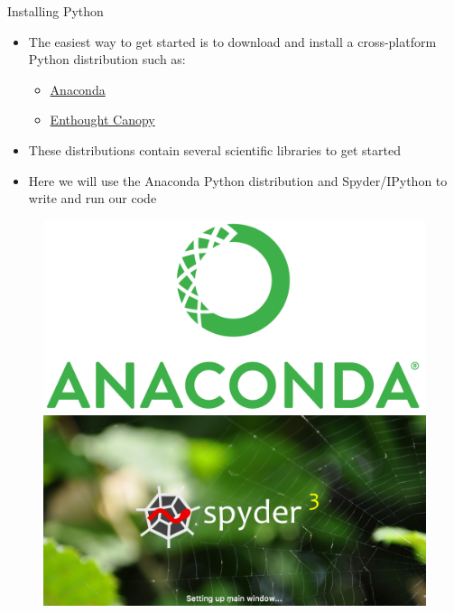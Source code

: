 \documentclass[pdf]{beamer}
\begin{document}
\begin{frame}{Installing Python}
\begin{itemize}\addtolength{\itemsep}{0.5\baselineskip}
	\item The easiest way to get started is to download and install a cross-platform Python distribution such as:
	\begin{itemize}
		\item \href{https://www.continuum.io/downloads}{Anaconda}
		\item \href{https://store.enthought.com/downloads/}{Enthought Canopy}
	\end{itemize}
	\item These distributions contain several scientific libraries to get started
	\item Here we will use the Anaconda Python distribution and Spyder/IPython to write and run our code  
\end{itemize}

\begin{figure}
\includegraphics[width=.45\textwidth]{anaconda.png}\hfill
\includegraphics[width=.45\textwidth]{spyder.png}
\end{figure}

\end{frame}

\end{document}
